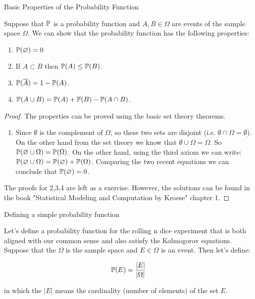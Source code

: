 \begin{thmbox}{Basic Properties of the Probability Function}

Suppose that $\mathbb{P}$ is a probability function and $A,B \in \Omega$ are events of the sample space $\Omega$. We can show that the probability function has the following properties:

\begin{enumerate}

\item $\mathbb{P}(\varnothing) = 0$

\item If $A \subset B$ then $\mathbb{P}(A) \leq \mathbb{P}(B)$.

\item $\mathbb{P}(\overline{A}) = 1 - \mathbb{P}(A)$.

\item $\mathbb{P}(A \cup B) = \mathbb{P}(A) + \mathbb{P}(B) - \mathbb{P}(A \cap B)$.

\end{enumerate}

\end{thmbox}


\begin{proof}
The properties can be proved using the basic set theory theorems.

\begin{enumerate}

\item Since $\emptyset$ is the complement of $\Omega$, so these two sets are disjoint (i.e. $\emptyset \cap \Omega = \emptyset$). On the other hand from the set theory we know that $\emptyset \cup \Omega = \Omega$. So $\mathbb{P}(\varnothing \cup \Omega) = \mathbb{P}(\Omega)$. On the other hand, using the third axiom we can write: $\mathbb{P}(\varnothing \cup \Omega) = \mathbb{P}(\varnothing) + \mathbb{P}(\Omega)$. Comparing the two recent equations we can conclude that $\mathbb{P}(\varnothing) = 0$.



\end{enumerate}



The proofs for 2,3,4 are left as a exercise. However, the solutions can be found in the book "Statistical Modeling and Computation by Kroese" chapter 1. 


\end{proof}



\begin{example}{Defining a simple probability function}

Let's define a probability function for the rolling n dice experiment that is both aligned with our common sense and also satisfy the Kolmogorov equations. Suppose that the $\Omega$ is the sample space and $E \in \Omega$ is an event. Then let's define:

$$\mathbb{P}(E) = \frac{\lvert E \rvert}{\lvert \Omega \rvert}$$

in which the $\lvert E \rvert$ means the cardinality (number of elements) of the set $E$.

\end{example}



